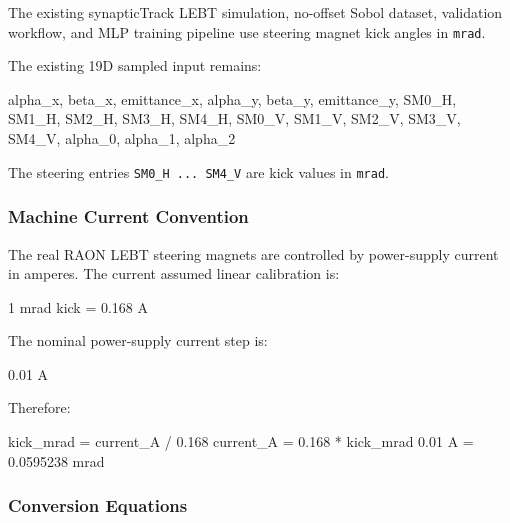 \documentclass[
]{article}
\newenvironment{Shaded}{}{}
\newcommand{\NormalTok}[1]{#1}
\begin{document}
The existing synapticTrack LEBT simulation, no-offset Sobol dataset,
validation workflow, and MLP training pipeline use steering magnet kick
angles in \texttt{mrad}.

The existing 19D sampled input remains:

\begin{Shaded}
\begin{Highlighting}[]
\NormalTok{alpha\_x, beta\_x, emittance\_x,}
\NormalTok{alpha\_y, beta\_y, emittance\_y,}
\NormalTok{SM0\_H, SM1\_H, SM2\_H, SM3\_H, SM4\_H,}
\NormalTok{SM0\_V, SM1\_V, SM2\_V, SM3\_V, SM4\_V,}
\NormalTok{alpha\_0, alpha\_1, alpha\_2}
\end{Highlighting}
\end{Shaded}

The steering entries \texttt{SM0\_H\ ...\ SM4\_V} are kick values in
\texttt{mrad}.

\hypertarget{machine-current-convention}{%
\subsubsection{Machine Current
Convention}\label{machine-current-convention}}

The real RAON LEBT steering magnets are controlled by power-supply
current in amperes. The current assumed linear calibration is:

\begin{Shaded}
\begin{Highlighting}[]
\NormalTok{1 mrad kick = 0.168 A}
\end{Highlighting}
\end{Shaded}

The nominal power-supply current step is:

\begin{Shaded}
\begin{Highlighting}[]
\NormalTok{0.01 A}
\end{Highlighting}
\end{Shaded}

Therefore:

\begin{Shaded}
\begin{Highlighting}[]
\NormalTok{kick\_mrad = current\_A / 0.168}
\NormalTok{current\_A = 0.168 * kick\_mrad}
\NormalTok{0.01 A = 0.0595238 mrad}
\end{Highlighting}
\end{Shaded}

\hypertarget{conversion-equations}{%
\subsubsection{Conversion Equations}\label{conversion-equations}}
\end{document}
